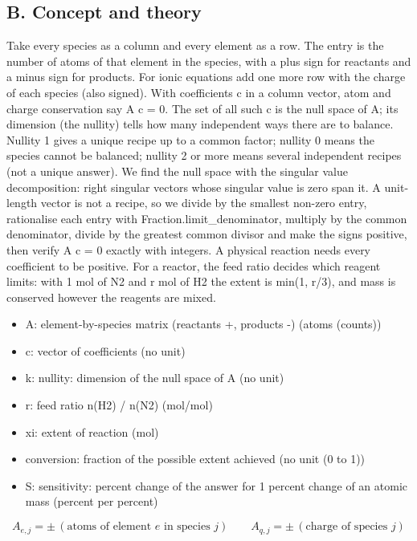 \documentclass[11pt,a4paper]{article}
\begin{document}
\subsection*{B. Concept and theory}
Take every species as a column and every element as a row. The entry is the number of atoms of that element in the species, with a plus sign for reactants and a minus sign for products. For ionic equations add one more row with the charge of each species (also signed). With coefficients c in a column vector, atom and charge conservation say A c = 0. The set of all such c is the null space of A; its dimension (the nullity) tells how many independent ways there are to balance. Nullity 1 gives a unique recipe up to a common factor; nullity 0 means the species cannot be balanced; nullity 2 or more means several independent recipes (not a unique answer). We find the null space with the singular value decomposition: right singular vectors whose singular value is zero span it. A unit-length vector is not a recipe, so we divide by the smallest non-zero entry, rationalise each entry with Fraction.limit\_denominator, multiply by the common denominator, divide by the greatest common divisor and make the signs positive, then verify A c = 0 exactly with integers. A physical reaction needs every coefficient to be positive. For a reactor, the feed ratio decides which reagent limits: with 1 mol of N2 and r mol of H2 the extent is min(1, r/3), and mass is conserved however the reagents are mixed.

\begin{itemize}[nosep]
\item A: element-by-species matrix (reactants +, products -) (atoms (counts))
\item c: vector of coefficients (no unit)
\item k: nullity: dimension of the null space of A (no unit)
\item r: feed ratio n(H2) / n(N2) (mol/mol)
\item xi: extent of reaction (mol)
\item conversion: fraction of the possible extent achieved (no unit (0 to 1))
\item S: sensitivity: percent change of the answer for 1 percent change of an atomic mass (percent per percent)
\end{itemize}

\begin{equation*}
A_{e,j}=\pm\,(\text{atoms of element }e\text{ in species }j)\qquad A_{q,j}=\pm\,(\text{charge of species }j)
\end{equation*}
\end{document}
